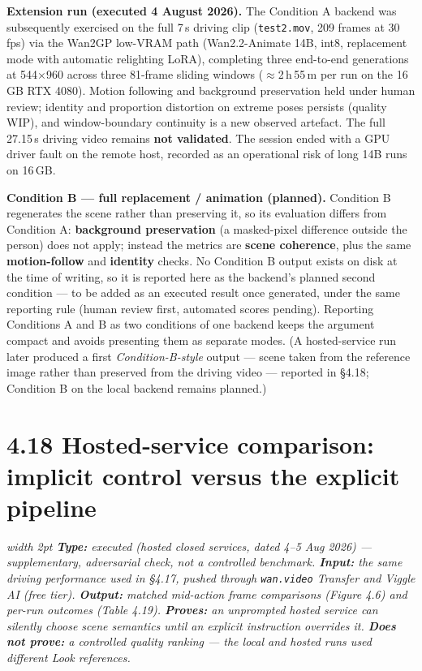 \documentclass[10pt,twocolumn,letterpaper]{article}
\newenvironment{quotebox}%
 {\par\vspace{3pt}\noindent\begin{list}{}{\setlength{\leftmargin}{1em}\setlength{\rightmargin}{0.5em}}\item\footnotesize\itshape\color{black!80}\hspace*{-0.6em}\vrule width 2pt\hspace{0.6em}\ignorespaces}%
 {\end{list}\vspace{3pt}}
\begin{document}
\textbf{Extension run (executed 4 August 2026).} The Condition A backend was subsequently exercised on the full 7\,s driving clip (\texttt{test2.mov}, 209 frames at 30 fps) via the Wan2GP low-VRAM path (Wan2.2-Animate 14B, int8, replacement mode with automatic relighting LoRA), completing three end-to-end generations at 544$\times$960 across three 81-frame sliding windows ($\approx$2\,h\,55\,m per run on the 16\,GB RTX 4080). Motion following and background preservation held under human review; identity and proportion distortion on extreme poses persists (quality WIP), and window-boundary continuity is a new observed artefact. The full 27.15\,s driving video remains \textbf{not validated}. The session ended with a GPU driver fault on the remote host, recorded as an operational risk of long 14B runs on 16\,GB.

\textbf{Condition B --- full replacement / animation (planned).} Condition B regenerates the scene rather than preserving it, so its evaluation differs from Condition A: \textbf{background preservation} (a masked-pixel difference outside the person) does not apply; instead the metrics are \textbf{scene coherence}, plus the same \textbf{motion-follow} and \textbf{identity} checks. No Condition B output exists on disk at the time of writing, so it is reported here as the backend's planned second condition --- to be added as an executed result once generated, under the same reporting rule (human review first, automated scores pending). Reporting Conditions A and B as two conditions of one backend keeps the argument compact and avoids presenting them as separate modes. (A hosted-service run later produced a first \emph{Condition-B-style} output --- scene taken from the reference image rather than preserved from the driving video --- reported in \S{}4.18; Condition B on the local backend remains planned.)


\section*{4.18 Hosted-service comparison: implicit control versus the explicit pipeline}

\begin{quotebox}
\textbf{Type:} executed (hosted closed services, dated 4--5 Aug 2026) --- supplementary, adversarial check, not a controlled benchmark. \quad \textbf{Input:} the same driving performance used in \S{}4.17, pushed through \texttt{wan.video} Transfer and Viggle AI (free tier). \quad \textbf{Output:} matched mid-action frame comparisons (Figure 4.6) and per-run outcomes (Table 4.19). \quad \textbf{Proves:} an unprompted hosted service can silently choose scene semantics until an explicit instruction overrides it. \quad \textbf{Does not prove:} a controlled quality ranking --- the local and hosted runs used different Look references.
\end{quotebox}
\end{document}
